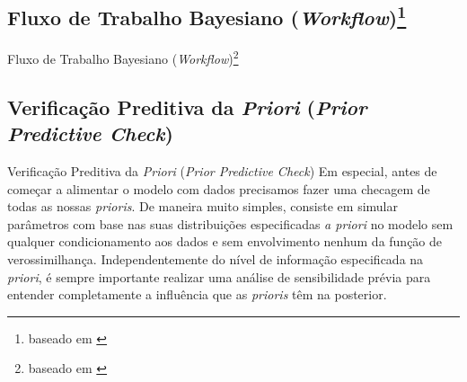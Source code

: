 \subsection{Fluxo de Trabalho Bayesiano (\textit{Workflow})\footnote{baseado em \textcite{gelmanBayesianWorkflow2020}}}
\begin{frame}{Fluxo de Trabalho Bayesiano (\textit{Workflow})\footnote{baseado em \textcite{gelmanBayesianWorkflow2020}}}
    \centering
\end{frame}

\subsection{Verificação Preditiva da \textit{Priori} (\textit{Prior Predictive Check})}
\begin{frame}{Verificação Preditiva da \textit{Priori} (\textit{Prior Predictive Check})}
    Em especial, antes de começar a alimentar o modelo com dados precisamos fazer uma
    checagem de todas as nossas \textit{prioris}.
    \vfill
    De maneira muito simples, consiste em simular parâmetros com base nas suas distribuições
    especificadas \textit{a priori} no modelo sem qualquer condicionamento aos dados e
    sem envolvimento nenhum da função de verossimilhança.
    \vfill
    Independentemente do nível de informação especificada na \textit{priori},
    é sempre importante realizar uma análise de sensibilidade prévia para entender completamente
    a influência que as \textit{prioris} têm na posterior.
\end{frame}

